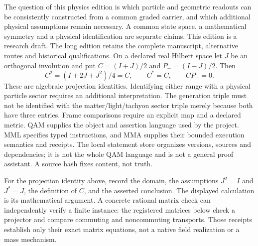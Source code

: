 The question of this physics edition is which particle and geometric readouts
can be consistently constructed from a common graded carrier, and which
additional physical assumptions remain necessary. A common state space,
a mathematical symmetry and a physical identification are separate claims.
This edition is a research draft. The long edition retains the complete
manuscript, alternative routes and historical qualifications.
On a declared real Hilbert space let $J$ be an orthogonal involution and
put $C=(I+J)/2$ and $P_-=(I-J)/2$. Then
\[
C^2=(I+2J+J^2)/4=C,\qquad C^*=C,\qquad CP_-=0.
\]
These are algebraic projection identities. Identifying either range with
a physical particle sector requires an additional interpretation. The
generation triple must not be identified with the matter/light/tachyon
sector triple merely because both have three entries. Frame comparisons
require an explicit map and a declared metric.
QAM supplies the object and assertion language used by the project. MML
specifies typed instructions, and MMA supplies their bounded execution
semantics and receipts. The local statement store organizes versions,
sources and dependencies; it is not the whole QAM language and is not
a general proof assistant. A source hash fixes content, not truth.

For the projection identity above, record the domain, the assumptions
$J^2=I$ and $J^*=J$, the definition of $C$, and the asserted conclusion.
The displayed calculation is its mathematical argument. A concrete
rational matrix check can independently verify a finite instance: the
registered matrices below check a projector and compare commuting and
noncommuting transports. Those receipts establish only their exact matrix
equations, not a native field realization or a mass mechanism.

